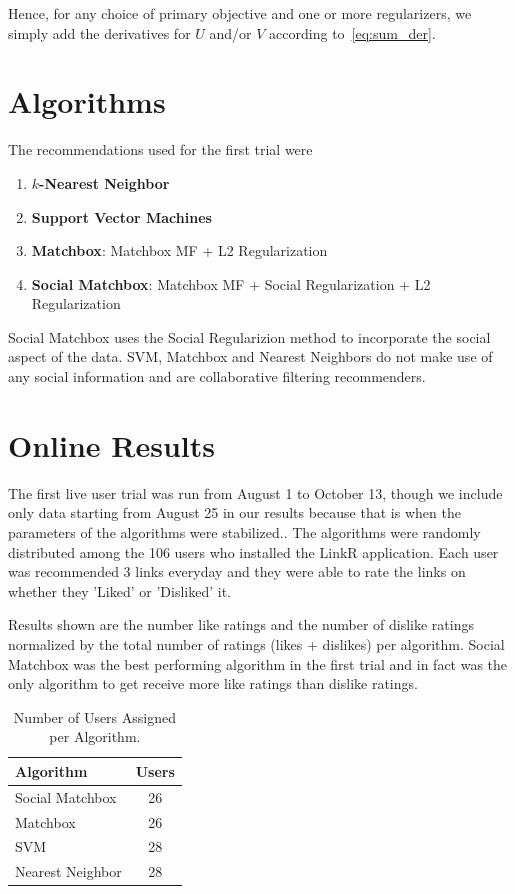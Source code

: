 Hence, for any choice of primary objective and one or more regularizers,
we simply add the derivatives for $U$ and/or $V$ 
according to~\eqref{eq:sum_der}.



\section{Algorithms}

The recommendations used for the first trial were 

\begin{enumerate}
\item{ {\bf $k$-Nearest Neighbor}}
\item{{\bf Support Vector Machines}}
\item{{\bf Matchbox}: Matchbox MF  + L2 Regularization}
\item{{\bf Social Matchbox}: Matchbox MF + Social Regularization + L2 Regularization}
\end{enumerate}

Social Matchbox uses the Social Regularizion method to incorporate the social aspect of the data. SVM, Matchbox and Nearest Neighbors do not make use of any social information and are collaborative filtering recommenders.

\section{Online Results}

The first live user trial was run from August 1 to October 13, though we include only data starting from August 25 in our results because that is when the parameters of the algorithms were stabilized.. The algorithms were randomly distributed among the 106 users who installed the LinkR application. Each user was recommended 3 links everyday and they were able to rate the links on whether they 'Liked' or 'Disliked' it. 

Results shown are the number like ratings and the number of dislike ratings normalized by the total number of ratings (likes + dislikes) per algorithm. Social Matchbox was the best performing algorithm in the first trial and in fact was the only algorithm to get receive more like ratings than dislike ratings. %

\begin{table}[h!]
\centering
\begin{tabular}{| l | c |}
\hline
{\bf Algorithm} & {\bf Users} \\
\hline
Social Matchbox & 26\\
Matchbox  & 26 \\
SVM & 28 \\
Nearest Neighbor & 28 \\
\hline
\end{tabular}
\caption{Number of Users Assigned per Algorithm.}
\end{table}

